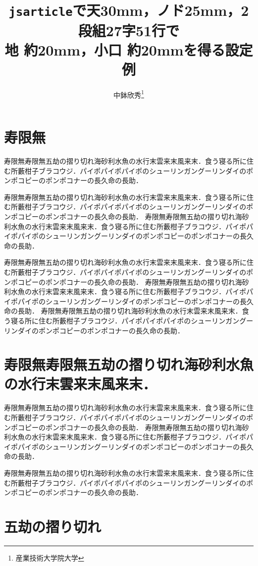 \documentclass[a4j, 12Q, twocolumn, twoside]{jsarticle}
\title{\texttt{jsarticle}で天30mm，ノド25mm，2段組27字51行で\\地 約20mm，小口 約20mmを得る設定例}
\author{中鉢欣秀\thanks{産業技術大学院大学}}
\begin{document}
\maketitle
\section{寿限無}
  \the\baselineskip

寿限無寿限無五劫の摺り切れ海砂利水魚の水行末雲来末風来末．食う寝る所に住む所藪柑子ブラコウジ．パイポパイポパイポのシューリンガングーリンダイのポンポコピーのポンポコナーの長久命の長助．

寿限無寿限無五劫の摺り切れ海砂利水魚の水行末雲来末風来末．食う寝る所に住む所藪柑子ブラコウジ．パイポパイポパイポのシューリンガングーリンダイのポンポコピーのポンポコナーの長久命の長助．
寿限無寿限無五劫の摺り切れ海砂利水魚の水行末雲来末風来末．食う寝る所に住む所藪柑子ブラコウジ．パイポパイポパイポのシューリンガングーリンダイのポンポコピーのポンポコナーの長久命の長助．

寿限無寿限無五劫の摺り切れ海砂利水魚の水行末雲来末風来末．食う寝る所に住む所藪柑子ブラコウジ．パイポパイポパイポのシューリンガングーリンダイのポンポコピーのポンポコナーの長久命の長助．
寿限無寿限無五劫の摺り切れ海砂利水魚の水行末雲来末風来末．食う寝る所に住む所藪柑子ブラコウジ．パイポパイポパイポのシューリンガングーリンダイのポンポコピーのポンポコナーの長久命の長助．
寿限無寿限無五劫の摺り切れ海砂利水魚の水行末雲来末風来末．食う寝る所に住む所藪柑子ブラコウジ．パイポパイポパイポのシューリンガングーリンダイのポンポコピーのポンポコナーの長久命の長助．
\section{寿限無寿限無五劫の摺り切れ海砂利水魚の水行末雲来末風来末．}
寿限無寿限無五劫の摺り切れ海砂利水魚の水行末雲来末風来末．食う寝る所に住む所藪柑子ブラコウジ．パイポパイポパイポのシューリンガングーリンダイのポンポコピーのポンポコナーの長久命の長助．
寿限無寿限無五劫の摺り切れ海砂利水魚の水行末雲来末風来末．食う寝る所に住む所藪柑子ブラコウジ．パイポパイポパイポのシューリンガングーリンダイのポンポコピーのポンポコナーの長久命の長助．

寿限無寿限無五劫の摺り切れ海砂利水魚の水行末雲来末風来末．食う寝る所に住む所藪柑子ブラコウジ．パイポパイポパイポのシューリンガングーリンダイのポンポコピーのポンポコナーの長久命の長助．
\section{五劫の摺り切れ}
\end{document}
